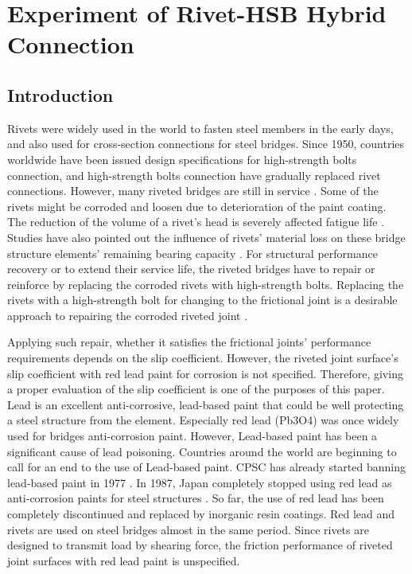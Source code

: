 \chapter{Experiment of Rivet-HSB Hybrid Connection}
\label{ch4}

\begin{spacing}{1.25} %
\minitoc %
\end{spacing} %
\onehalfspacing %
\section{Introduction}


Rivets were widely used in the world to fasten steel members in the early days, and also used for cross-section connections for steel bridges. Since 1950, countries worldwide have been issued design specifications for high-strength bolts connection, and high-strength bolts connection have gradually replaced rivet connections. However, many riveted bridges are still in service \cite{Collette2014Experimental1880s1890s}. Some of the rivets might be corroded and loosen due to deterioration of the paint coating. The reduction of the volume of a rivet's head is severely affected fatigue life \cite{Heinemeyer2011TheConnections}. Studies have also pointed out the influence of rivets' material loss on these bridge structure elements' remaining bearing capacity \cite{Hashimoto2010,Macho2016}. For structural performance recovery or to extend their service life, the riveted bridges have to repair or reinforce by replacing the corroded rivets with high-strength bolts. Replacing the rivets with a high-strength bolt for changing to the frictional joint is a desirable approach to repairing the corroded riveted joint \cite{KOMATSU2015}.
    
Applying such repair, whether it satisfies the frictional joints' performance requirements depends on the slip coefficient. However, the riveted joint surface's slip coefficient with red lead paint for corrosion is not specified. Therefore, giving a proper evaluation of the slip coefficient is one of the purposes of this paper.
Lead is an excellent anti-corrosive, lead-based paint that could be well protecting a steel structure from the element. Especially red lead (Pb3O4) was once widely used for bridges anti-corrosion paint. However, Lead-based paint has been a significant cause of lead poisoning. Countries around the world are beginning to call for an end to the use of Lead-based paint. \ac{CPSC} has already started banning lead-based paint in 1977 \cite{CPSC1977}. In 1987, Japan completely stopped using red lead as anti-corrosion paints for steel structures \cite{rtri1987Steel}. So far, the use of red lead has been completely discontinued and replaced by inorganic resin coatings. Red lead and rivets are used on steel bridges almost in the same period. Since rivets are designed to transmit load by shearing force, the friction performance of riveted joint surfaces with red lead paint is unspecified. 

